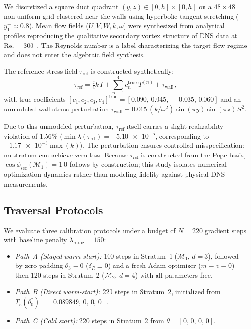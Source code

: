 \documentclass[preprint,aps,prb,longbibliography,superscriptaddress]{revtex4-2}
\newcommand{\tref}{\tau_{\text{ref}}}
\begin{document}
We discretized a square duct quadrant $(y,z) \in [0,h] \times [0,h]$ on a
$48 \times 48$ non-uniform grid clustered near the walls using hyperbolic
tangent stretching ($y_1^+ \approx 0.8$). Mean flow fields ($U, V, W, k, \omega$)
were synthesized from analytical profiles reproducing the qualitative secondary
vortex structure of DNS data at $\mathrm{Re}_\tau = 300$~\cite{Pinelli2010}.
The Reynolds number is a label characterizing the target flow regime and does
not enter the algebraic field synthesis.

The reference stress field $\tref$ is constructed synthetically:
\begin{equation}\label{eq:tref}
  \tref = \tfrac{2}{3}k\,I + \sum_{n=1}^{4} c_n^{\mathrm{true}}\, T^{(n)}
  + \tau_{\mathrm{wall}}\,,
\end{equation}
with true coefficients $[c_1, c_2, c_3, c_4]^{\mathrm{true}} =
[0.090,\, 0.045,\, {-}0.035,\, 0.060]$ and an unmodeled wall stress perturbation
$\tau_{\mathrm{wall}} = 0.015\,(k/\omega^2)\sin(\pi y)\sin(\pi z)\,S^2$.

Due to this unmodeled perturbation, $\tref$ itself carries a slight realizability
violation of $1.56\%$ ($\min\lambda(\tref) = \num{-5.10e-5}$, corresponding to
$\num{-1.17e-3}\max(k)$). The perturbation ensures controlled misspecification:
no stratum can achieve zero loss. Because $\tref$ is constructed from the Pope
basis, $\cos\phi_{\mathrm{sec}}(\mathcal{M}_1) = 1.0$ follows by construction;
this study isolates numerical optimization dynamics rather than modeling
fidelity against physical DNS measurements.

\subsection{Traversal Protocols}\label{sec:protocols}

We evaluate three calibration protocols under a budget of $N = 220$ gradient
steps with baseline penalty $\lambda_{\mathrm{realiz}} = 150$:
\begin{itemize}
  \item \textit{Path~A (Staged warm-start):} 100 steps in Stratum~1
    ($\mathcal{M}_1$, $d=3$), followed by zero-padding $\theta_3 = 0$
    ($\delta_R \equiv 0$) and a fresh Adam optimizer ($m = v = 0$), then
    120 steps in Stratum~2 ($\mathcal{M}_2$, $d=4$) with all parameters free.
  \item \textit{Path~B (Direct warm-start):} 220 steps in Stratum~2,
    initialized from $T_e(\theta_0^*) = [0.089849,\, 0,\, 0,\, 0]$.
  \item \textit{Path~C (Cold start):} 220 steps in Stratum~2 from
    $\theta = [0,\, 0,\, 0,\, 0]$.
\end{itemize}
\end{document}
